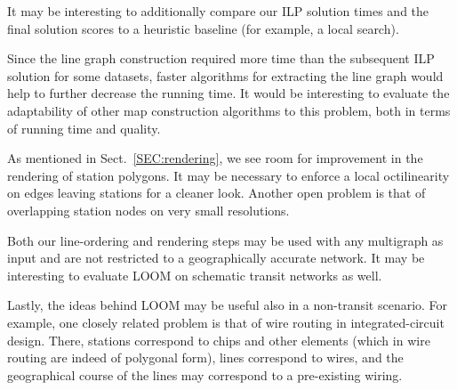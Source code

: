 \documentclass[format=acmsmall, review=false, screen=true]{acmart}
\newcommand\TODO[1]{\textcolor{blue}{\small [TODO: #1]}}
\begin{document}
It may be interesting to additionally compare our ILP solution times and the final solution scores to a heuristic baseline (for example, a local search).

Since the line graph construction required more time than the subsequent ILP solution for some datasets, faster algorithms for extracting the line graph would help to further decrease the running time. It would be interesting to evaluate the adaptability of other map construction algorithms to this problem, both in terms of running time and quality.

As mentioned in Sect.~\ref{SEC:rendering}, we see room for improvement in the rendering of station polygons. It may be necessary to enforce a local octilinearity on edges leaving stations for a cleaner look. Another open problem is that of overlapping station nodes on very small resolutions.

Both our line-ordering and rendering steps may be used with any multigraph as input and are not restricted to a geographically accurate network. It may be interesting to evaluate LOOM on schematic transit networks as well.

Lastly, the ideas behind LOOM may be useful also in a non-transit scenario.
For example, one closely related problem is that of wire routing in integrated-circuit design.
There, stations correspond to chips and other elements (which in wire routing are indeed of polygonal form), lines correspond to wires, and the geographical course of the lines may correspond to a pre-existing wiring.


%
%
%



\end{document}
